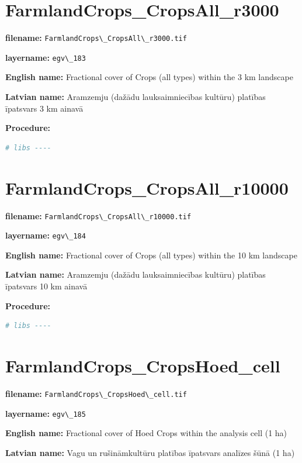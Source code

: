 \documentclass[
]{book}
\newcommand{\passthrough}[1]{#1}
\begin{document}
\section{FarmlandCrops\_CropsAll\_r3000}\label{ch06.183}

\textbf{filename:} \passthrough{\lstinline!FarmlandCrops\_CropsAll\_r3000.tif!}

\textbf{layername:} \passthrough{\lstinline!egv\_183!}

\textbf{English name:} Fractional cover of Crops (all types) within the 3 km landscape

\textbf{Latvian name:} Aramzemju (dažādu lauksaimniecības kultūru) platības īpatsvars 3 km ainavā

\textbf{Procedure:}

\begin{lstlisting}[language=R]
# libs ----
\end{lstlisting}

\section{FarmlandCrops\_CropsAll\_r10000}\label{ch06.184}

\textbf{filename:} \passthrough{\lstinline!FarmlandCrops\_CropsAll\_r10000.tif!}

\textbf{layername:} \passthrough{\lstinline!egv\_184!}

\textbf{English name:} Fractional cover of Crops (all types) within the 10 km landscape

\textbf{Latvian name:} Aramzemju (dažādu lauksaimniecības kultūru) platības īpatsvars 10 km ainavā

\textbf{Procedure:}

\begin{lstlisting}[language=R]
# libs ----
\end{lstlisting}

\section{FarmlandCrops\_CropsHoed\_cell}\label{ch06.185}

\textbf{filename:} \passthrough{\lstinline!FarmlandCrops\_CropsHoed\_cell.tif!}

\textbf{layername:} \passthrough{\lstinline!egv\_185!}

\textbf{English name:} Fractional cover of Hoed Crops within the analysis cell (1 ha)

\textbf{Latvian name:} Vagu un rušināmkultūru platības īpatsvars analīzes šūnā (1 ha)
\end{document}
